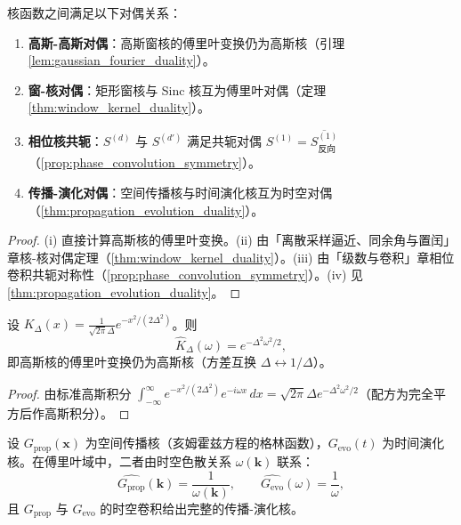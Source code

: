\begin{property}[核函数的对偶关系]\label{prop:kernel_duality}
核函数之间满足以下对偶关系：
\begin{enumerate}[label=(\roman*)]
    \item \textbf{高斯-高斯对偶}：高斯窗核的傅里叶变换仍为高斯核（引理 \ref{lem:gaussian_fourier_duality}）。
    \item \textbf{窗-核对偶}：矩形窗核与 Sinc 核互为傅里叶对偶（定理 \ref{thm:window_kernel_duality}）。
    \item \textbf{相位核共轭}：$S^{(d)}$ 与 $S^{(d')}$ 满足共轭对偶 $S^{(1)} = \overline{S^{(1)}_{\text{反向}}}$（\cref{prop:phase_convolution_symmetry}）。
    \item \textbf{传播-演化对偶}：空间传播核与时间演化核互为时空对偶（\cref{thm:propagation_evolution_duality}）。
\end{enumerate}
\end{property}

\begin{proof}
(i) 直接计算高斯核的傅里叶变换。(ii) 由「离散采样逼近、同余角与置闰」章核-核对偶定理（\cref{thm:window_kernel_duality}）。(iii) 由「级数与卷积」章相位卷积共轭对称性（\cref{prop:phase_convolution_symmetry}）。(iv) 见 \cref{thm:propagation_evolution_duality}。
\end{proof}

\begin{lemma}[高斯核的傅里叶自对偶]\label{lem:gaussian_fourier_duality}
设 $K_\Delta(x) = \frac{1}{\sqrt{2\pi}\Delta}e^{-x^2/(2\Delta^2)}$。则
\[
\hat K_\Delta(\omega) = e^{-\Delta^2\omega^2/2},
\]
即高斯核的傅里叶变换仍为高斯核（方差互换 $\Delta\leftrightarrow 1/\Delta$）。
\end{lemma}

\begin{proof}
由标准高斯积分 $\int_{-\infty}^\infty e^{-x^2/(2\Delta^2)}e^{-i\omega x}\,dx = \sqrt{2\pi}\Delta e^{-\Delta^2\omega^2/2}$（配方为完全平方后作高斯积分）。
\end{proof}

\begin{theorem}[传播核与演化核的时空对偶]\label{thm:propagation_evolution_duality}
设 $G_{\text{prop}}(\mathbf{x})$ 为空间传播核（亥姆霍兹方程的格林函数），$G_{\text{evo}}(t)$ 为时间演化核。在傅里叶域中，二者由时空色散关系 $\omega(\mathbf{k})$ 联系：
\[
\widehat{G_{\text{prop}}}(\mathbf{k}) = \frac{1}{\omega(\mathbf{k})}, \qquad \widehat{G_{\text{evo}}}(\omega) = \frac{1}{\omega},
\]
且 $G_{\text{prop}}$ 与 $G_{\text{evo}}$ 的时空卷积给出完整的传播-演化核。
\end{theorem}

